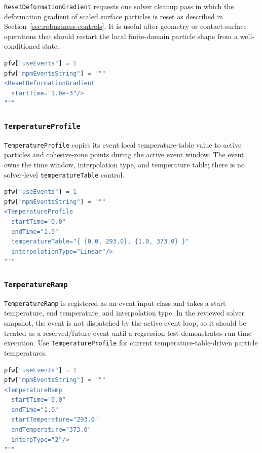 \texttt{ResetDeformationGradient} requests one solver cleanup pass in which the deformation gradient of scaled surface particles is reset as described in Section~\ref{sec:robustness-controls}.  It is useful after geometry or contact-surface operations that should restart the local finite-domain particle shape from a well-conditioned state.

\begin{lstlisting}[language=Python,caption={Reset-deformation-gradient event.}]
pfw["useEvents"] = 1
pfw["mpmEventsString"] = """
<ResetDeformationGradient
  startTime="1.0e-3"/>
"""
\end{lstlisting}

\subsubsection{\texttt{TemperatureProfile}}

\texttt{TemperatureProfile} copies its event-local temperature-table value to active particles and cohesive-zone points during the active event window.  The event owns the time window, interpolation type, and temperature table; there is no solver-level \texttt{temperatureTable} control.

\begin{lstlisting}[language=Python,caption={Temperature-profile event.}]
pfw["useEvents"] = 1
pfw["mpmEventsString"] = """
<TemperatureProfile
  startTime="0.0"
  endTime="1.0"
  temperatureTable="{ {0.0, 293.0}, {1.0, 373.0} }"
  interpolationType="Linear"/>
"""
\end{lstlisting}

\subsubsection{\texttt{TemperatureRamp}}

\texttt{TemperatureRamp} is registered as an event input class and takes a start temperature, end temperature, and interpolation type.  In the reviewed solver snapshot, the event is not dispatched by the active event loop, so it should be treated as a reserved/future event until a regression test demonstrates run-time execution.  Use \texttt{TemperatureProfile} for current temperature-table-driven particle temperatures.

\begin{lstlisting}[language=Python,caption={Registered but currently not dispatched temperature-ramp event.}]
pfw["useEvents"] = 1
pfw["mpmEventsString"] = """
<TemperatureRamp
  startTime="0.0"
  endTime="1.0"
  startTemperature="293.0"
  endTemperature="373.0"
  interpType="2"/>
"""
\end{lstlisting}

